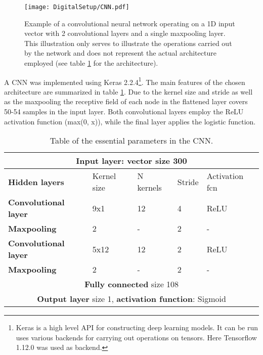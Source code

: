 \documentclass[main.tex]{subfiles}
\begin{document}
\begin{figure}[ht!]
    \centering
        \texttt{[image: DigitalSetup/CNN.pdf]}
        \caption[]{Example of a convolutional neural network operating on a 1D input vector with 2 convolutional layers and a single maxpooling layer. This illustration only serves to illustrate the operations carried out by the network and does not represent the actual architecture employed (see table \ref{tab:architecture} for the architecture).}
    \label{fig:CNN} 
\end{figure}

A CNN was implemented using Keras 2.2.4\footnote{Keras is a high level API for constructing deep learning models. It can be run uses various backends for carrying out operations on tensors. Here Tensorflow 1.12.0 was used as backend.}\cite{keras}. The main features of the chosen architecture are summarized in table \ref{tab:architecture}. Due to the kernel size and stride as well as the maxpooling the receptive field of each node in the flattened layer covers 50-54 samples in the input layer. Both convolutional layers employ the ReLU activation function (max(0, x)), while the final layer applies the logistic function.
\begin{table}[h]
\center
\begin{tabular}{|l|l|l|l|l|}
\hline
\multicolumn{5}{|c|}{\textbf{Input layer}: vector size 300}                                            \\ \hline
\textbf{Hidden layers}       & Kernel size & N kernels & Stride & Activation fcn \\ \hline
\textbf{Convolutional layer} & 9x1           & 12                & 4             & ReLU                \\ \hline
\textbf{Maxpooling}          & 2           & -                 & 2             & -                   \\ \hline
\textbf{Convolutional layer} & 5x12           & 12                & 2             & ReLU                \\ \hline
\textbf{Maxpooling}          & 2           & -                 & 2             & -                   \\ \hline
\multicolumn{5}{|c|}{\textbf{Fully connected} size 108}
\\ \hline
\multicolumn{5}{|c|}{\textbf{Output layer} size 1, \textbf{activation function}: Sigmoid}               \\ \hline
\end{tabular}
\caption{Table of the essential parameters in the CNN.}
\label{tab:architecture}
\end{table}
\end{document}
